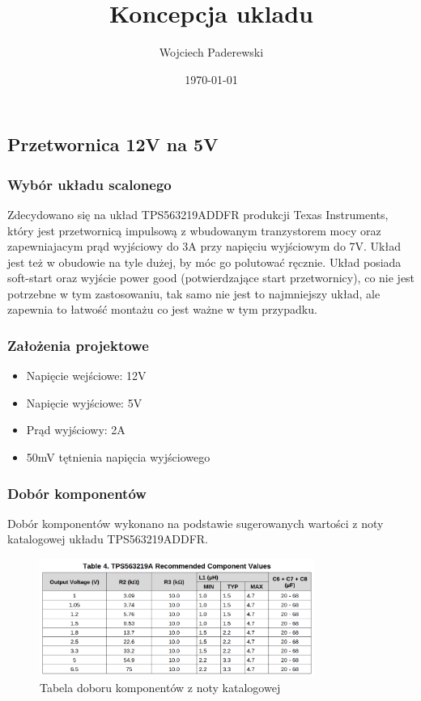 \documentclass[../main.tex]{subfiles}
\author{Wojciech Paderewski}
\date{\today}
\title{Koncepcja ukladu}
\begin{document}
\subsection{Przetwornica 12V na 5V}
\subsubsection{Wybór układu scalonego}

Zdecydowano się na układ TPS563219ADDFR produkcji Texas Instruments, który jest przetwornicą impulsową z wbudowanym tranzystorem mocy oraz zapewniajacym prąd wyjściowy do 3A przy 
napięciu wyjściowym do 7V. Układ jest też w obudowie na tyle dużej, by móc go polutować ręcznie. Układ posiada soft-start oraz wyjście power good (potwierdzające start przetwornicy), co nie jest potrzebne w tym zastosowaniu, tak samo 
nie jest to najmniejszy układ, ale zapewnia to łatwość montażu co jest ważne w tym przypadku.

\subsubsection{Założenia projektowe}
\begin{itemize}
    \item Napięcie wejściowe: 12V
    \item Napięcie wyjściowe: 5V
    \item Prąd wyjściowy: 2A
    \item 50mV tętnienia napięcia wyjściowego
\end{itemize}

\subsubsection{Dobór komponentów}
Dobór komponentów wykonano na podstawie sugerowanych wartości z noty katalogowej układu TPS563219ADDFR.

\begin{figure}[H]
    \centering
    \includegraphics[width=0.8\textwidth]{conv-table.png}
    \caption{Tabela doboru komponentów z noty katalogowej}
\end{figure}
\end{document}
